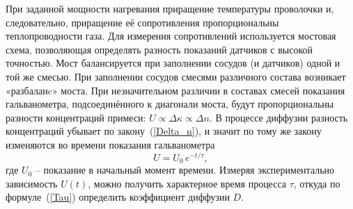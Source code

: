 \documentclass[a4paper, 12pt]{article}
\begin{document}
        При заданной мощности нагревания приращение температуры  проволочки и, следовательно, приращение её сопротивления пропорциональны теплопроводности газа. Для измерения сопротивлений используется мостовая схема, позволяющая определять разность показаний датчиков с высокой точностью. Мост балансируется при заполнении сосудов (и датчиков) одной и той же смесью. При заполнении сосудов смесями различного состава возникает «разбаланc» моста. При незначительном различии в составах смесей показания гальванометра, подсоединённого к диагонали моста, будут пропорциональны разности концентраций примеси: $U\propto\Delta \kappa \propto \Delta n$. В процессе диффузии разность концентраций убывает по закону~(\ref{Delta_n}), и значит по тому же закону изменяются во времени показания гальванометра
        \begin{equation}
            U = U_0 \, e^{-t / \tau},
        \end{equation}
        где $U_0$ -- показание в начальный момент времени. Измеряя экспериментально зависимость $U(t)$, можно получить характерное время процесса $\tau$, откуда по формуле~(\ref{Tau}) определить коэффициент диффузии $D$.
\end{document}

